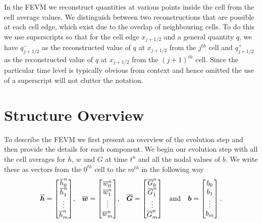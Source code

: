 In the FEVM we reconstruct quantities at various points inside the cell from the cell average values. We distinguish between two reconstructions that are possible at each cell edge, which exist due to the overlap of neighbouring cells. To do this we use superscripts so that for the cell edge $x_{j+1/2}$ and a general quantity $q$, we have $q^-_{j+1/2}$ as the reconstructed value of $q$ at $x_{j+1/2}$ from the $j^{th}$ cell and $q^+_{j+1/2}$ as the reconstructed value of $q$ at $x_{j+1/2}$ from the $(j+1)^{th}$ cell. Since the particular time level is typically obvious from context and hence omitted the use of a superscript will not clutter the notation.

\section{Structure Overview}
\label{sec:StructOverview}
To describe the FEVM we first present an overview of the evolution step and then provide the details for each component. We begin our evolution step with all the cell averages for $h$, $w$ and $G$ at time $t^n$ and all the nodal values of $b$. We write these as vectors from the $0^{th}$ cell to the $m^{th}$ in the following way
\begin{align*} \overline{\boldsymbol{h}} = \begin{bmatrix}
\overline{h}_0^n \\\overline{h}_1^n \\ \vdots \\ \overline{h}_m^n \end{bmatrix} &,& \overline{\boldsymbol{w}} = \begin{bmatrix}
\overline{w}_0^n \\\overline{w}_1^n \\ \vdots \\ \overline{w}_m^n \end{bmatrix} &,&  \overline{\boldsymbol{G}} = \begin{bmatrix}
\overline{G}_0^n \\\overline{G}_1^n \\ \vdots \\ \overline{G}_m^n \end{bmatrix}& &\text{and}& & \boldsymbol{b} = \begin{bmatrix}
b_{0} \\ b_{1} \\ \vdots \\b_{m}
\end{bmatrix}. \\
\end{align*}
